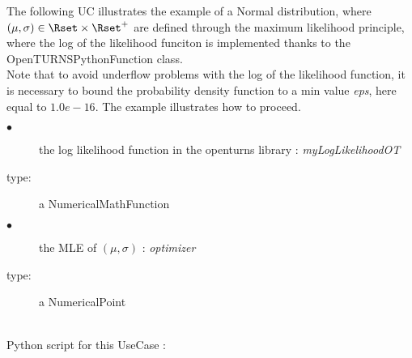The following UC illustrates the example of a Normal distribution, where $(\mu, \sigma) \in \Rset \times \Rset^+$ are defined through the maximum likelihood principle, where the log of the likelihood funciton  is implemented thanks to the OpenTURNSPythonFunction class.\\

Note that to avoid underflow problems with the log of the likelihood function, it is necessary to bound the probability density function to a min value \textit{eps}, here equal to $1.0e-16$. The example illustrates how to proceed.\\


             {
               \begin{description}
               \item[$\bullet$] the log likelihood function in the openturns library : {\itshape myLogLikelihoodOT}
               \item[type:] a NumericalMathFunction
               \item[$\bullet$] the  MLE of $(\mu, \sigma)$ : {\itshape optimizer}
               \item[type:] a NumericalPoint
               \end{description}
             }

             \textspace\\
             Python script for this UseCase :

